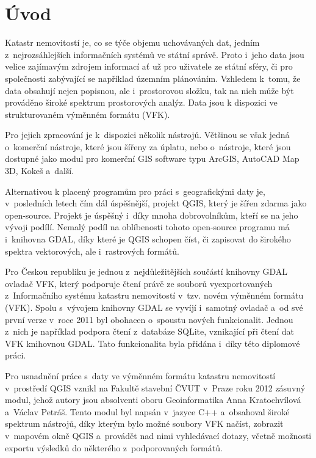 \documentclass[a4paper,12pt,oneside]{book}
\begin{document}
\chapter*{Úvod}

Katastr nemovitostí je, co se týče objemu uchovávaných dat, jedním
z~nejrozsáhlejších informačních systémů ve státní správě. Proto i~jeho
data jsou velice zajímavým zdrojem informací ať už pro uživatele ze
státní sféry, či pro společnosti zabývající se například územním
plánováním. Vzhledem k~tomu, že data obsahují nejen popisnou, ale
i~prostorovou složku, tak na nich může být prováděno široké spektrum
prostorových analýz. Data jsou k dispozici ve strukturovaném výměnném
formátu (VFK).

Pro jejich zpracování je k~dispozici několik nástrojů. Většinou se
však jedná o~komerční nástroje, které jsou šířeny za úplatu, nebo
o~nástroje, které jsou dostupné jako modul pro komerční GIS software
typu ArcGIS, AutoCAD Map 3D, Kokeš a~další.

Alternativou k placený programům pro práci s~geografickými daty je,
v~posledních letech čím dál úspěšnější, projekt QGIS, který je šířen zdarma
jako open-source. Projekt je úspěšný i~díky mnoha dobrovolníkům,
kteří se na jeho vývoji podílí. Nemalý podíl na oblíbenosti tohoto
open-source programu má i~knihovna GDAL, díky které je QGIS schopen
číst, či zapisovat do širokého spektra vektorových, ale i~rastrových
formátů.

Pro Českou republiku je jednou z~nejdůležitějších součástí knihovny
GDAL ovladač VFK, který podporuje čtení právě ze souborů
vyexportovaných z~Informačního systému katastru nemovitostí
v~tzv. novém výměnném formátu (VFK). Spolu s~vývojem knihovny GDAL se
vyvíjí i~samotný ovladač a~od své první verze v~roce 2011 byl obohacen
o~spoustu nových funkcionalit. Jednou z~nich je například podpora
čtení z~databáze SQLite, vznikající při čtení dat VFK knihovnou
GDAL. Tato funkcionalita byla přidána i~díky této diplomové práci.

Pro usnadnění práce s~daty ve výměnném formátu katastru nemovitostí
v~prostředí QGIS vznikl na Fakultě stavební ČVUT v~Praze roku 2012
zásuvný modul, jehož autory jsou absolventi oboru
Geoinformatika Anna Kratochvílová a~Václav Petráš. Tento modul byl
napsán v~jazyce C++ a~obsahoval široké spektrum nástrojů, díky kterým
bylo možné soubory VFK načíst, zobrazit v~mapovém okně QGIS a~provádět
nad nimi vyhledávací dotazy, včetně možnosti exportu výsledků do
některého z~podporovaných formátů.
\end{document}
